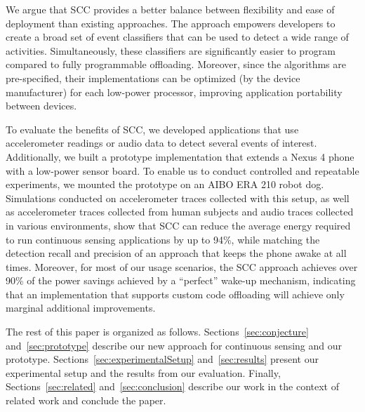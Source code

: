 We argue that SCC provides a better
balance between flexibility and ease of deployment than existing
approaches.  The approach empowers developers to create a broad set of
event classifiers that can be used to detect a wide range of
activities.  Simultaneously, these classifiers are significantly
easier to program compared to fully programmable offloading.
Moreover, since the algorithms are pre-specified, their
implementations can be optimized (by the device manufacturer) for each
low-power processor, improving application portability between
devices.  

To evaluate the benefits of SCC, we developed applications that use 
accelerometer readings or audio data to detect several events of 
interest.  Additionally, we built a prototype implementation that extends 
a Nexus 4 phone with a low-power sensor board.  To enable us to 
conduct controlled and repeatable experiments,
we mounted the prototype on an AIBO ERA 210 robot dog.  Simulations 
conducted on accelerometer traces collected with this setup,
as well as accelerometer traces collected from human subjects and audio
traces collected in various environments, show that
SCC can reduce the average energy required to run continuous
sensing applications by up to 94\%, while matching the detection recall
and precision of an approach that keeps the phone awake at all times.
Moreover, for most of our usage scenarios, the SCC approach
achieves over 90\% of the power savings achieved by a ``perfect''
wake-up mechanism, indicating that an implementation that supports
custom code offloading will achieve only marginal additional
improvements.

The rest of this paper is organized as follows.  Sections~\ref{sec:conjecture}
and~\ref{sec:prototype} describe our new approach for continuous sensing
and our prototype.  Sections~\ref{sec:experimentalSetup} 
and~\ref{sec:results} present our
experimental setup and the results from our evaluation.  Finally,
Sections~\ref{sec:related} and~\ref{sec:conclusion} describe our work
in the context of related work and conclude the paper.


